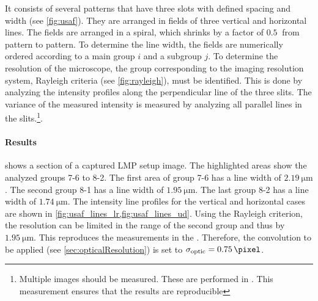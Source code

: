 It consists of several patterns that have three slots with defined spacing and width (see \cref{fig:usaf}).
They are arranged in fields of three vertical and horizontal lines.
The fields are arranged in a spiral, which shrinks by a factor of $\SI{0.5}{}$ from pattern to pattern.
To determine the line width, the fields are numerically ordered according to a main group $i$ and a subgroup $j$.
To determine the resolution of the microscope, the group corresponding to the imaging resolution system, \ie{} Rayleigh criteria (see \cref{fig:rayleigh}), must be identified.
This is done by analyzing the intensity profiles along the perpendicular line of the three slits.
The variance of the measured intensity is measured by analyzing all parallel lines in the slits.\footnote{Multiple images should be measured. These are performed in \cite{MenzelMaster}. This measurement ensures that the results are reproducible}.
% 
\paragraph{Results}
 shows a section of a captured \ac{LMP} setup image.
The highlighted areas show the analyzed groups 7-6 to 8-2.
The first area of group 7-6  has a line width of $\SI{2.19}{\micro\meter}$.
The second group 8-1  has a line width of $\SI{1.95}{\micro\meter}$.
The last group 8-2  has a line width of $\SI{1.74}{\micro\meter}$.
The intensity line profiles for the vertical and horizontal cases are shown in \cref{fig:usaf_lines_lr,fig:usaf_lines_ud}.
% 
Using the Rayleigh criterion, the resolution can be limited in the range of the second group and thus by $\SI{1.95}{\micro\meter}$.
This reproduces the measurements in the \cite{MenzelMaster}.
Therefore, the convolution to be applied (see \cref{sec:opticalResolution}) is set to $\opticsigma = \SI{0.75}{\pixel}$.
% 
% 
% 
